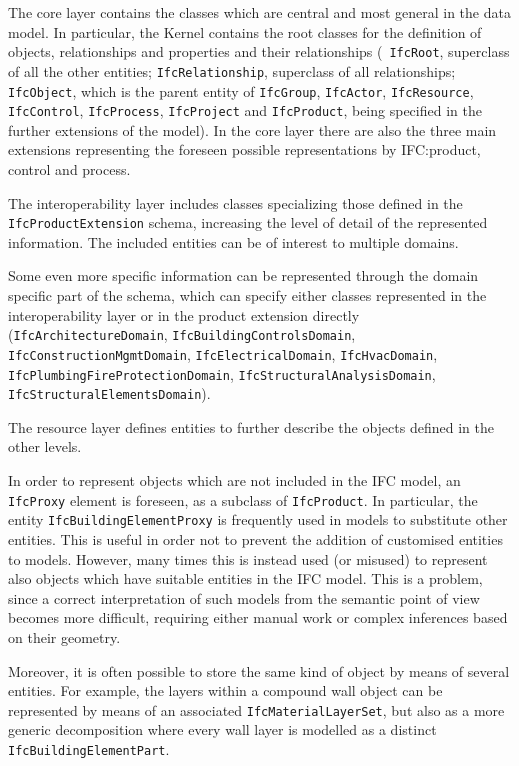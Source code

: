The core layer contains the classes which are central and most general in the data model.
In particular, the Kernel contains the root classes for the definition of objects, relationships and properties and their relationships (\eg\ \texttt{IfcRoot}, superclass of all the other entities; \texttt{IfcRelationship}, superclass of all relationships; \texttt{IfcObject}, which is the parent entity of \texttt{IfcGroup}, \texttt{IfcActor}, \texttt{IfcResource}, \texttt{Ifc\-Con\-trol}, \texttt{IfcProcess}, \texttt{IfcProject} and \texttt{IfcProduct}, being specified in the further extensions of the model).
In the core layer there are also the three main extensions representing the foreseen possible representations by IFC:\@ product, control and process.

The interoperability layer includes classes specializing those defined in the \texttt{IfcProductExtension} schema, increasing the level of detail of the represented information. The included entities can be of interest to multiple domains.

Some even more specific information can be represented through the domain specific part of the schema, which can specify either classes represented in the interoperability layer or in the product extension directly (\texttt{IfcArchitectureDomain}, \texttt{IfcBuildingControlsDomain}, \texttt{Ifc\-Cons\-truc\-tion\-Mgmt\-Do\-main}, \texttt{IfcElectricalDomain}, \texttt{IfcHvacDomain}, \texttt{Ifc\-Plum\-bing\-Fire\-Pro\-tec\-tion\-Do\-main}, \texttt{Ifc\-Struc\-tu\-ral\-A\-na\-ly\-sis\-Do\-main}, \texttt{Ifc\-Struc\-tu\-ral\-E\-le\-ments\-Do\-main}).

The resource layer defines entities to further describe the objects defined in the other levels.

In order to represent objects which are not included in the IFC model, an \texttt{IfcProxy} element is foreseen, as a subclass of \texttt{IfcProduct}.
In particular, the entity \texttt{IfcBuildingElementProxy} is frequently used in models to substitute other entities.
This is useful in order not to prevent the addition of customised entities to models. However, many times this is instead used (or misused) to represent also objects which have suitable entities in the IFC model.
This is a problem, since a correct interpretation of such models from the semantic point of view becomes more difficult, requiring either manual work or complex inferences based on their geometry.

Moreover, it is often possible to store the same kind of object by means of several entities.
For example, the layers within a compound wall object can be represented by means of an associated \texttt{IfcMaterialLayerSet}, but also as a more generic decomposition where every wall layer is modelled as a distinct \texttt{IfcBuildingElementPart}.


